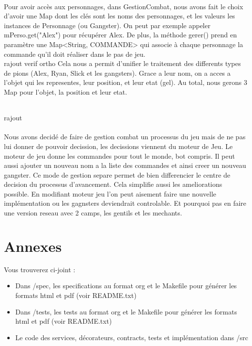 \documentclass[a4paper,titlepage,openany,12pt]{report}
\begin{document}
\paragraph{}
Pour avoir accès aux personnages, dans GestionCombat, nous avons fait le choix d'avoir une Map dont les
clés sont les noms des personnages, et les valeurs les instances de Personnage (ou Gangster). On peut par 
exemple appeler mPerso.get("Alex") pour récupérer Alex.
De plus, la méthode gerer() prend en paramètre une Map<String, COMMANDE> qui associe à chaque personnage
la commande qu'il doit réaliser dans le pas de jeu.
\\ rajout verif ortho
Cela nous a permit d'unifier le traitement des differents types de
pions (Alex, Ryan, Slick et les gangsters).
Grace a leur nom, on a acces a l'objet qui les representes, leur
position, et leur etat (gel).
Au total, nous gerons 3 Map pour l'objet, la position et leur etat.

\\ rajout
\paragraph{}
Nous avons decidé de faire de gestion combat un processus du jeu mais
de ne pas lui donner de pouvoir decission, les decissions viennent du
moteur de Jeu.
Le moteur de jeu donne les commandes pour tout le monde, bot compris.
Il peut aussi ajouter un nouveau nom a la liste des commandes et ainsi
creer un nouveau gangster.
Ce mode de gestion separe permet de bien differencier le centre de
decision du processus d'avancement. Cela simplifie aussi les
ameliorations possible.
En modifiant moteur jeu l'on peut aisement faire une nouvelle
implémentation ou les gagnsters deviendrait controlable. Et pourquoi
pas en faire une version reseau avec 2 camps, les gentils et les mechants.


\section*{Annexes}

Vous trouverez ci-joint :
\begin{itemize}
\item Dans /spec, les specifications au format org et le Makefile pour générer les formats html et pdf (voir README.txt)
\item Dans /tests, les tests au format org et le Makefile pour générer les formats html et pdf (voir README.txt)
\item Le code des services, décorateurs, contracts, tests et implémentation dans /src
\end{itemize}
\end{document}

